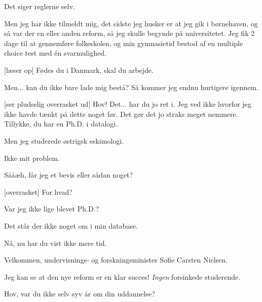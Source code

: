 \documentclass[a4paper,11pt]{article}
\begin{document}
\begin{sketch}
 Det siger reglerne selv.

 Men jeg har ikke tilmeldt mig, det sidste jeg husker er at
jeg gik i børnehaven, og så var der en eller anden reform, så jeg
skulle begynde på universitetet.  Jeg fik 2 dage til at gennemføre
folkeskolen, og min gymnasietid bestod af en multiple choice test med
én svarmulighed.

[læser op] Fødes du i Danmark, skal du arbejde.

 Men... kan du ikke bare lade mig bestå?  Så kommer jeg endnu
hurtigere igennem.

[ser pludselig overrasket ud] Hov!  Det... har du jo ret i.
Jeg ved ikke hvorfor jeg ikke havde tænkt på dette noget før.  Det gør
det jo straks meget nemmere.  Tillykke, du har en Ph.D. i datalogi.

 Men jeg studerede østrigsk eskimologi.

 Ikke mit problem.


 Sååæh, får jeg et bevis eller sådan noget?

[overrasket] For hvad?

 Var jeg ikke lige blevet Ph.D.?

 Det står der ikke noget om i min database.


 Nå, nu har du vist ikke mere tid.






 Velkommen, undervisnings- og forskningsminister Sofie Carsten
Nielsen.

 Jeg kan se at den nye reform er en klar succes!  \emph{Ingen}
forsinkede studerende.

 Hov, var du ikke selv syv år om din uddannelse?



\end{sketch}
\end{document}
